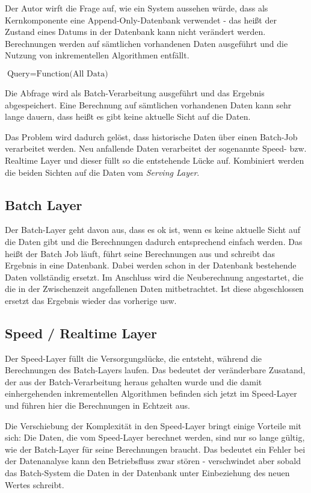 \documentclass[a4paper,11pt]{scrartcl}
\begin{document}
Der Autor wirft die Frage auf, wie ein System aussehen würde, dass als
Kernkomponente eine Append-Only-Datenbank verwendet - das heißt der Zustand
eines Datums in der Datenbank kann nicht verändert werden. Berechnungen werden
auf sämtlichen vorhandenen Daten ausgeführt und die Nutzung von inkrementellen
Algorithmen entfällt.

$\text{Query} = \text{Function(All Data)}$

Die Abfrage wird als Batch-Verarbeitung ausgeführt und das Ergebnis
abgespeichert. Eine Berechnung auf sämtlichen vorhandenen Daten kann sehr lange
dauern, dass heißt es gibt keine aktuelle Sicht auf die Daten.

Das Problem wird dadurch gelöst, dass historische Daten über einen Batch-Job
verarbeitet werden. Neu anfallende Daten verarbeitet der sogenannte Speed- bzw.
Realtime Layer und dieser füllt so die entstehende Lücke auf. Kombiniert werden
die beiden Sichten auf die Daten vom \textit{Serving Layer}.

\subsection{Batch Layer}
Der Batch-Layer geht davon aus, dass es ok ist, wenn es keine aktuelle Sicht
auf die Daten gibt und die Berechnungen dadurch entsprechend einfach werden.
Das heißt der Batch Job läuft, führt seine Berechnungen aus und schreibt das
Ergebnis in eine Datenbank. Dabei werden schon in der Datenbank bestehende
Daten vollständig ersetzt. Im Anschluss wird die Neuberechnung angestartet, die
die in der Zwischenzeit angefallenen Daten mitbetrachtet. Ist diese
abgeschlossen ersetzt das Ergebnis wieder das vorherige usw.

\subsection{Speed / Realtime Layer}
Der Speed-Layer füllt die Versorgungslücke, die entsteht, während die
Berechnungen des Batch-Layers laufen. Das bedeutet der veränderbare Zusatand,
der aus der Batch-Verarbeitung heraus gehalten wurde und die damit
einhergehenden inkrementellen Algorithmen befinden sich jetzt im Speed-Layer
und führen hier die Berechnungen in Echtzeit aus.

Die Verschiebung der Komplexität in den Speed-Layer bringt einige Vorteile mit
sich: Die Daten, die vom Speed-Layer berechnet werden, sind nur so lange
gültig, wie der Batch-Layer für seine Berechnungen braucht. Das bedeutet ein
Fehler bei der Datenanalyse kann den Betriebsfluss zwar stören - verschwindet
aber sobald das Batch-System die Daten in der Datenbank unter Einbeziehung des
neuen Wertes schreibt.
\end{document}
